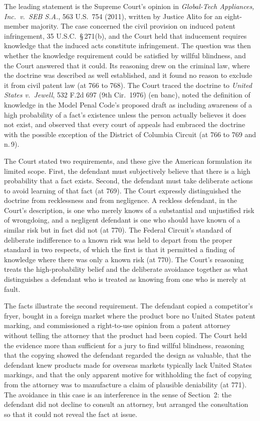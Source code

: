 \documentclass[11pt]{article}
\theoremstyle{plain}
\theoremstyle{definition}
\begin{document}
The leading statement is the Supreme Court's opinion in \emph{Global-Tech Appliances, Inc.\ v.\ SEB S.A.}, 563 U.S.\ 754 (2011), written by Justice Alito for an eight-member majority. The case concerned the civil provision on induced patent infringement, 35 U.S.C.\ \S\,271(b), and the Court held that inducement requires knowledge that the induced acts constitute infringement. The question was then whether the knowledge requirement could be satisfied by willful blindness, and the Court answered that it could. Its reasoning drew on the criminal law, where the doctrine was described as well established, and it found no reason to exclude it from civil patent law (at 766 to 768). The Court traced the doctrine to \emph{United States v.\ Jewell}, 532 F.2d 697 (9th Cir.\ 1976) (en banc), noted the definition of knowledge in the Model Penal Code's proposed draft as including awareness of a high probability of a fact's existence unless the person actually believes it does not exist, and observed that every court of appeals had embraced the doctrine with the possible exception of the District of Columbia Circuit (at 766 to 769 and n.\,9).

The Court stated two requirements, and these give the American formulation its limited scope. First, the defendant must subjectively believe that there is a high probability that a fact exists. Second, the defendant must take deliberate actions to avoid learning of that fact (at 769). The Court expressly distinguished the doctrine from recklessness and from negligence. A reckless defendant, in the Court's description, is one who merely knows of a substantial and unjustified risk of wrongdoing, and a negligent defendant is one who should have known of a similar risk but in fact did not (at 770). The Federal Circuit's standard of deliberate indifference to a known risk was held to depart from the proper standard in two respects, of which the first is that it permitted a finding of knowledge where there was only a known risk (at 770). The Court's reasoning treats the high-probability belief and the deliberate avoidance together as what distinguishes a defendant who is treated as knowing from one who is merely at fault.

The facts illustrate the second requirement. The defendant copied a competitor's fryer, bought in a foreign market where the product bore no United States patent marking, and commissioned a right-to-use opinion from a patent attorney without telling the attorney that the product had been copied. The Court held the evidence more than sufficient for a jury to find willful blindness, reasoning that the copying showed the defendant regarded the design as valuable, that the defendant knew products made for overseas markets typically lack United States markings, and that the only apparent motive for withholding the fact of copying from the attorney was to manufacture a claim of plausible deniability (at 771). The avoidance in this case is an interference in the sense of Section~2: the defendant did not decline to consult an attorney, but arranged the consultation so that it could not reveal the fact at issue.
\end{document}
